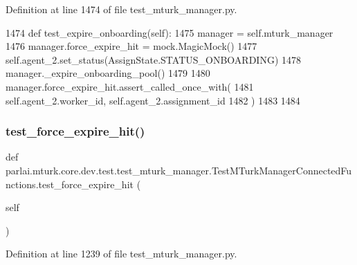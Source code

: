Definition at line 1474 of file test\+\_\+mturk\+\_\+manager.\+py.


\begin{DoxyCode}
1474     \textcolor{keyword}{def }test\_expire\_onboarding(self):
1475         manager = self.mturk\_manager
1476         manager.force\_expire\_hit = mock.MagicMock()
1477         self.agent\_2.set\_status(AssignState.STATUS\_ONBOARDING)
1478         manager.\_expire\_onboarding\_pool()
1479 
1480         manager.force\_expire\_hit.assert\_called\_once\_with(
1481             self.agent\_2.worker\_id, self.agent\_2.assignment\_id
1482         )
1483 
1484 
\end{DoxyCode}
\mbox{\label{classparlai_1_1mturk_1_1core_1_1dev_1_1test_1_1test__mturk__manager_1_1TestMTurkManagerConnectedFunctions_a3e39e30f2cfbc368090fb01c3eba9797}} 
\subsubsection{\texorpdfstring{test\+\_\+force\+\_\+expire\+\_\+hit()}{test\_force\_expire\_hit()}}
{\footnotesize\ttfamily def parlai.\+mturk.\+core.\+dev.\+test.\+test\+\_\+mturk\+\_\+manager.\+Test\+M\+Turk\+Manager\+Connected\+Functions.\+test\+\_\+force\+\_\+expire\+\_\+hit (\begin{DoxyParamCaption}\item[{}]{self }\end{DoxyParamCaption})}



Definition at line 1239 of file test\+\_\+mturk\+\_\+manager.\+py.


